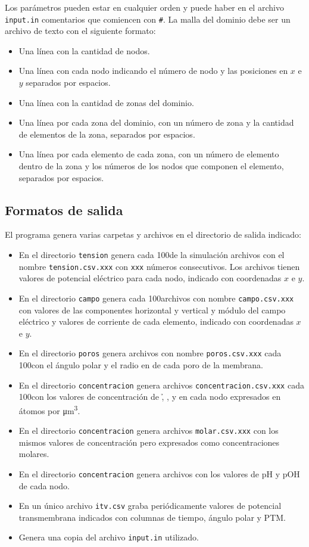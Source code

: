 Los parámetros pueden estar en cualquier orden y puede haber en el archivo \texttt{input.in} comentarios que comiencen con \texttt{\#}. La malla del dominio debe ser un archivo de texto con el siguiente formato:

\begin{itemize}
	\item Una línea con la cantidad de nodos.
	\item Una línea con cada nodo indicando el número de nodo y las posiciones en $x$ e $y$ separados por espacios.
	\item Una línea con la cantidad de zonas del dominio.
	\item Una línea por cada zona del dominio, con un número de zona y la cantidad de elementos de la zona, separados por espacios.
	\item Una línea por cada elemento de cada zona, con un número de elemento dentro de la zona y los números de los nodos que componen el elemento, separados por espacios.
\end{itemize}

\subsection*{Formatos de salida}

El programa genera varias carpetas y archivos en el directorio de salida indicado:

\begin{itemize}
	\item En el directorio \texttt{tension} genera cada 100\usec de la simulación archivos con el nombre \texttt{tension.csv.xxx} con \texttt{xxx} números consecutivos. Los archivos tienen valores de potencial eléctrico para cada nodo, indicado con coordenadas $x$ e $y$.
	\item En el directorio \texttt{campo} genera cada 100\usec archivos con nombre \texttt{campo.csv.xxx} con valores de las componentes horizontal y vertical y módulo del campo eléctrico y valores de corriente de cada elemento, indicado con coordenadas $x$ e $y$.
	\item En el directorio \texttt{poros} genera archivos con nombre \texttt{poros.csv.xxx} cada 100\usec con el ángulo polar y el radio en \um de cada poro de la membrana. 
	\item En el directorio \texttt{concentracion} genera archivos \texttt{concentracion.csv.xxx} cada 100\usec con los valores de concentración de \h, \oh, \na{} y \cl{} en cada nodo expresados en átomos por \si{\micro\metre\cubed}.
	\item En el directorio \texttt{concentracion} genera archivos \texttt{molar.csv.xxx} con los mismos valores de concentración pero expresados como concentraciones molares.
	\item En el directorio \texttt{concentracion} genera archivos con los valores de pH y pOH de cada nodo.
	\item En un único archivo \texttt{itv.csv} graba periódicamente valores de potencial transmembrana indicados con columnas de tiempo, ángulo polar y PTM.
	\item Genera una copia del archivo \texttt{input.in} utilizado.
\end{itemize}

